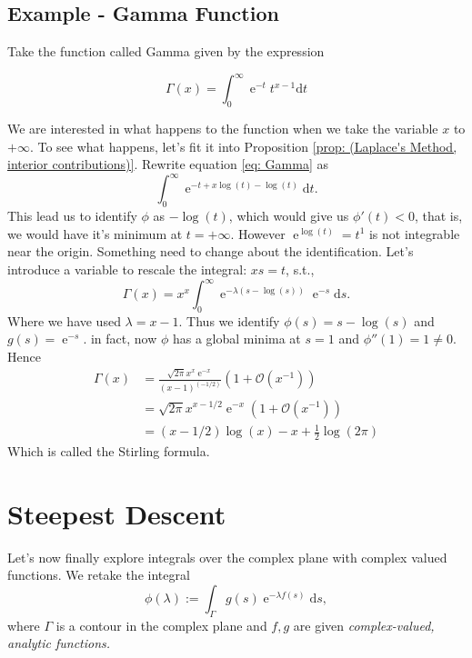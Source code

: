 \documentclass[]{report}
\DeclareMathOperator{\ee}{e}
\newcommand{\Boh}{\mathcal{O}}
\newcommand{\dd}{\mathrm{d}}
\numberwithin{equation}{section} %
\begin{document}
\subsection{Example - Gamma Function}

Take the function called Gamma given by the expression

\begin{equation}
	\Gamma(x) = \int_{0}^{\infty} \ee^{-t} t^{x-1} \dd t
	\label{eq: Gamma}
\end{equation}

We are interested in what happens to the function when we take the variable $x$ to $+\infty$. To see what happens, let's fit it into Proposition \ref{prop: (Laplace's Method, interior contributions)}. Rewrite equation \ref{eq: Gamma} as
$$\int_{0}^{\infty} \ee^{-t+x\log{(t)}-\log{(t)}} \dd t.$$ 
This lead us to identify $\phi$ as $-\log{(t)}$, which would give us $\phi'(t) < 0$, that is, we would have it's minimum at $t=+\infty$. However $\ee^{\log{(t)}} = t^1$ is not integrable near the origin. Something need to change about the identification. Let's introduce a variable to rescale the integral: $xs = t$, s.t.,
$$\Gamma(x) = x^x \int_{0}^{\infty} \ee^{-\lambda(s - \log{(s)})} \ee^{-s} \dd s.$$
Where we have used $\lambda = x - 1$. Thus we identify $\phi(s) = s - \log(s)$ and $g(s) = \ee^{-s}$. in fact, now $\phi$ has a global minima at $s = 1$ and $\phi''(1) = 1 \neq 0$. Hence
\begin{equation*}
	\begin{split}
		\Gamma(x) & = \frac{\sqrt{2\pi} x^x \ee^{-x}}{(x-1)^{(-1/2)}} (1 + \Boh(x^{-1})) \\
		& = \sqrt{2\pi} x^{x - 1/2} \ee^{-x} (1 + \Boh(x^{-1})) \\
		& = (x-1/2)\log{(x)} - x + \frac{1}{2} \log{(2\pi)}
	\end{split}
\end{equation*} 
Which is called the Stirling formula.

\section{Steepest Descent}

Let's now finally explore integrals over the complex plane with complex valued functions. We retake the integral 
\begin{equation}
	\phi(\lambda) := \int_{\Gamma} g(s) \ee^{-\lambda f(s)} \dd s,
	\label{eq: general int}
\end{equation}
where $\Gamma$ is a contour in the complex plane and $f, g$ are given \textit{complex-valued, analytic functions.}
\end{document}
